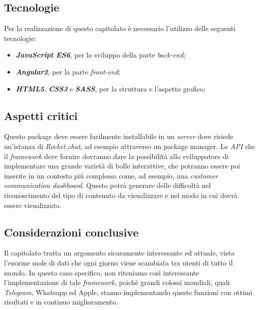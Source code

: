 \subsection{Tecnologie}

Per la realizzazione di questo capitolato è necessario l'utilizzo delle seguenti tecnologie:
\begin{itemize}
	\item \textbf{\textit{JavaScript ES6}}, per lo sviluppo della parte \textit{back-end};
	\item \textbf{\textit{Angular2}}, per la parte \textit{front-end};
	\item \textbf{\textit{HTML5}}, \textbf{\textit{CSS3}} e \textbf{\textit{SASS}}, per la struttura e l'aspetto grafico;
\end{itemize}

\subsection{Aspetti critici}

Questo package deve essere facilmente installabile in un \textit{server} dove
risiede un'istanza di \textit{Rocket.chat}, ad esempio attraverso un package
manager. Le \textit{API} che il \textit{framework} deve fornire dovranno dare la possibilità
allo sviluppatore di implementare una grande varietà di bolle interattive,
che potranno essere poi inserite in un contesto più complesso come, ad esempio, una \textit{customer communication dashboard}. Questo potrà generare delle difficoltà
nel riconoscimento del tipo di contenuto da visualizzare e nel modo
in cui dovrà essere visualizzato. 

\subsection{Considerazioni conclusive}

Il capitolato tratta un argomento sicuramente interessante ed attuale,
vista l'enorme mole di dati che ogni giorno viene scambiata tra utenti
di tutto il mondo. In questo caso specifico, non riteniamo così interessante
l'implementazione di tale \textit{framework}, poichè grandi colossi mondiali, quali \textit{Telegram}, Whatsapp ed Apple, stanno implementando queste funzioni con ottimi risultati e in continuo miglioramento.
